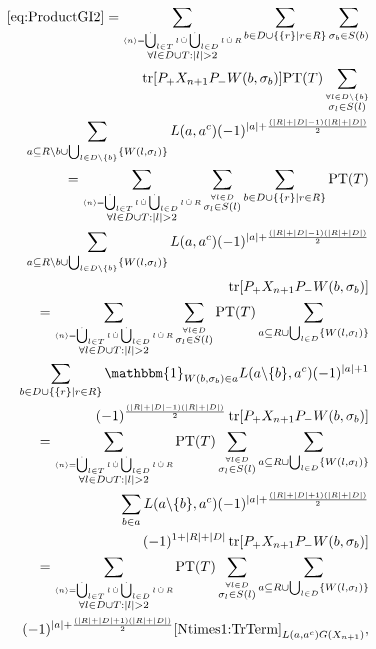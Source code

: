 \documentclass[b5paper,draft,openbib,12pt]{memoir}
\newcommand{\id}{\mathbbm{1}}
\DeclareMathOperator{\tr}{tr}
\DeclareMathOperator{\dotCup}{\mathop{\dot{\bigcup}}}
\DeclareMathOperator{\dotcup}{\mathop{\dot{\cup}}}
\begin{document}
\begin{align}\notag
\eqref{eq:ProductGI2}= \sum_{\stackrel{\langle n \rangle = \dotCup_{l\in T}l \dotcup \dotCup_{l\in D} l \dotcup R}{\forall l \in D \cup T: |l|>2} }\sum_{b \in D \cup \{ \{r\} \mid r\in R \}}  \sum_{\sigma_b \in S(b)}\\\notag
 \tr[P_+ X_{n+1} P_- W(b,\sigma_b)] \text{PT}(T) \sum_{\stackrel{\forall l \in D\backslash \{b\}}{\sigma_l \in S(l)}} \\\notag
 \sum_{a\subseteq R\backslash b \cup \bigcup_{l\in D\backslash \{b\}}\{W(l,\sigma_l)\}}  L(a,a^c) (-1)^{|a|+ \frac{(|R|+|D|-1)(|R|+|D|)}{2}}\\\notag
 =\sum_{\stackrel{\langle n \rangle = \dotCup_{l\in T}l \dotcup \dotCup_{l\in D} l \dotcup R}{\forall l \in D \cup T: |l|>2} }\sum_{\stackrel{\forall l \in D}{\sigma_l \in S(l)}}  \sum_{b \in D \cup \{ \{r\} \mid r\in R \}} \text{PT}(T)\\\notag
 \sum_{a\subseteq R\backslash b \cup \bigcup_{l\in D\backslash \{b\}}\{W(l,\sigma_l)\}}  L(a,a^c) (-1)^{|a|+ \frac{(|R|+|D|-1)(|R|+|D|)}{2}}\\\notag
\tr[P_+ X_{n+1} P_- W(b,\sigma_b)]   \\\notag
=\sum_{\stackrel{\langle n \rangle = \dotCup_{l\in T}l \dotcup \dotCup_{l\in D} l \dotcup R}{\forall l \in D \cup T: |l|>2} }\sum_{\stackrel{\forall l \in D}{\sigma_l \in S(l)}}   \text{PT}(T)  \sum_{a\subseteq R \cup \bigcup_{l\in D}\{W(l,\sigma_l)\}}\\\notag
\sum_{b \in D \cup \{ \{r\} \mid r\in R \}} \id_{W(b,\sigma_b)\in a}  L(a\backslash\{b\},a^c) (-1)^{|a|+1}\\\notag
(-1)^\frac{(|R|+|D|-1)(|R|+|D|)}{2} \tr[P_+ X_{n+1} P_- W(b,\sigma_b)]\\\notag
=\sum_{\stackrel{\langle n \rangle = \dotCup_{l\in T}l \dotcup \dotCup_{l\in D} l \dotcup R}{\forall l \in D \cup T: |l|>2} }\text{PT}(T) \sum_{\stackrel{\forall l \in D}{\sigma_l \in S(l)}}  \sum_{a\subseteq R \cup \bigcup_{l\in D}\{W(l,\sigma_l)\}} \\\notag
 \sum_{b \in a  }   L(a\backslash\{b\},a^c) (-1)^{|a|+\frac{(|R|+|D|+1)(|R|+|D|)}{2}}\\\notag
 (-1)^{1+|R|+|D|} \tr[P_+ X_{n+1} P_- W(b,\sigma_b)]\\\notag
 =\sum_{\stackrel{\langle n \rangle = \dotCup_{l\in T}l \dotcup \dotCup_{l\in D} l \dotcup R}{\forall l \in D \cup T: |l|>2} }\text{PT}(T) \sum_{\stackrel{\forall l \in D}{\sigma_l \in S(l)}}  \sum_{a\subseteq R \cup \bigcup_{l\in D}\{W(l,\sigma_l)\}} \\
   (-1)^{|a|+\frac{(|R|+|D|+1)(|R|+|D|)}{2}}  \eqref{Ntimes1:TrTerm}_{L(a,a^c) G(X_{n+1})},
\end{align}
\end{document}
